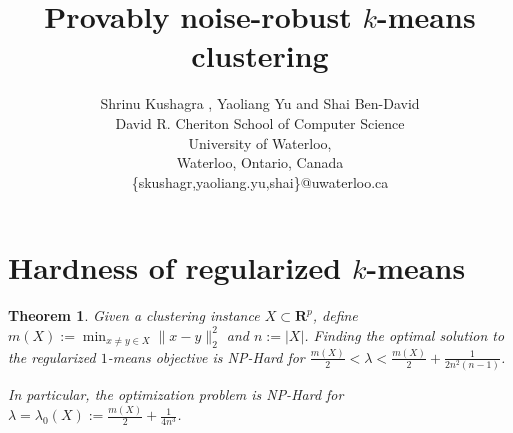 \documentclass[12pt]{article}
\title{Provably noise-robust $k$-means clustering}
\author{\normalsize
{Shrinu Kushagra} {\textnormal {,}} {Yaoliang Yu} {\textnormal {and}} {Shai Ben-David} \\
\normalsize David R. Cheriton School of Computer Science \\
\normalsize University of Waterloo,\\
\normalsize Waterloo, Ontario, Canada\\
\normalsize \{skushagr,yaoliang.yu,shai\}@uwaterloo.ca \\
}
\newcommand{\mb}{\mathbf}
\newtheorem{theorem}{Theorem}
\begin{document}
\fi

\section{Hardness of regularized $k$-means}
\label{a-section:hardness}
\begin{theorem}
\label{a-theorem:hardFork1Fixed}
Given a clustering instance $X \subset \mb R^{p}$, define $m( X) := \min_{x \neq y \in  X} \|x-y\|_{2}^2$ and $n := | X|$. Finding the optimal solution to the regularized $1$-means objective is NP-Hard for $\frac{m( X)}{2} < \lambda < \frac{m( X)}{2} + \frac{1}{2n^2(n-1)}$. 

In particular, the optimization problem is NP-Hard for $\lambda = \lambda_0( X) := \frac{m( X)}{2} + \frac{1}{4n^3}$.
\end{theorem}
\end{document}
